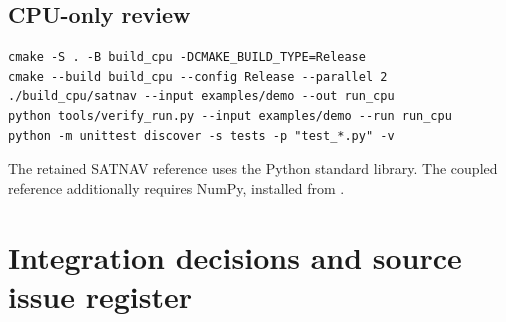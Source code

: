 \subsection{CPU-only review}
\begin{lstlisting}
cmake -S . -B build_cpu -DCMAKE_BUILD_TYPE=Release
cmake --build build_cpu --config Release --parallel 2
./build_cpu/satnav --input examples/demo --out run_cpu
python tools/verify_run.py --input examples/demo --run run_cpu
python -m unittest discover -s tests -p "test_*.py" -v
\end{lstlisting}
The retained SATNAV reference uses the Python standard library. The coupled
reference additionally requires NumPy, installed from .
\clearpage

\section{Integration decisions and source issue register}
\small

